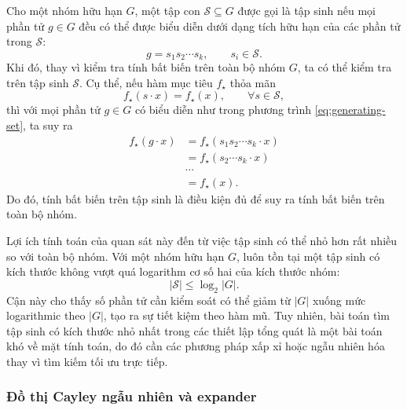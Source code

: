 Cho một nhóm hữu hạn $G$, một tập con $\mathcal{S} \subseteq G$ được gọi là tập sinh nếu mọi phần tử $g \in G$ đều có thể được biểu diễn dưới dạng tích hữu hạn của các phần tử trong $\mathcal{S}$:
\begin{equation}
    g = s_1 s_2 \cdots s_k,
    \qquad s_i \in \mathcal{S}.
    \label{eq:generating-set}
\end{equation}
Khi đó, thay vì kiểm tra tính bất biến trên toàn bộ nhóm $G$, ta có thể kiểm tra trên tập sinh $\mathcal{S}$. Cụ thể, nếu hàm mục tiêu $f_\star$ thỏa mãn
\begin{equation}
    f_\star(s \cdot x) = f_\star(x),
    \qquad \forall s \in \mathcal{S},
    \label{eq:invariance-on-generators}
\end{equation}
thì với mọi phần tử $g \in G$ có biểu diễn như trong phương trình \eqref{eq:generating-set}, ta suy ra
\begin{equation}
\begin{aligned}
    f_\star(g \cdot x)
    &= f_\star(s_1s_2\cdots s_k \cdot x) \\
    &= f_\star(s_2\cdots s_k \cdot x) \\
    &\cdots \\
    &= f_\star(x).
\end{aligned}
    \label{eq:generator-invariance-implies-group-invariance}
\end{equation}
Do đó, tính bất biến trên tập sinh là điều kiện đủ để suy ra tính bất biến trên toàn bộ nhóm.

Lợi ích tính toán của quan sát này đến từ việc tập sinh có thể nhỏ hơn rất nhiều so với toàn bộ nhóm. Với một nhóm hữu hạn $G$, luôn tồn tại một tập sinh có kích thước không vượt quá logarithm cơ số hai của kích thước nhóm:
\begin{equation}
    |\mathcal{S}| \leq \log_2 |G|.
    \label{eq:generator-size-bound}
\end{equation}
Cận này cho thấy số phần tử cần kiểm soát có thể giảm từ $|G|$ xuống mức logarithmic theo $|G|$, tạo ra sự tiết kiệm theo hàm mũ. Tuy nhiên, bài toán tìm tập sinh có kích thước nhỏ nhất trong các thiết lập tổng quát là một bài toán khó về mặt tính toán, do đó cần các phương pháp xấp xỉ hoặc ngẫu nhiên hóa thay vì tìm kiếm tối ưu trực tiếp.

\subsubsection{Đồ thị Cayley ngẫu nhiên và expander}

